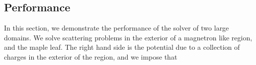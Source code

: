 \subsection{Performance}
In this section, we demonstrate the performance of the solver of two large domains. We solve scattering problems in the
exterior of a magnetron like region, and the maple leaf. The right hand side is the potential due to a collection of charges in the exterior of the region, and we impose that 